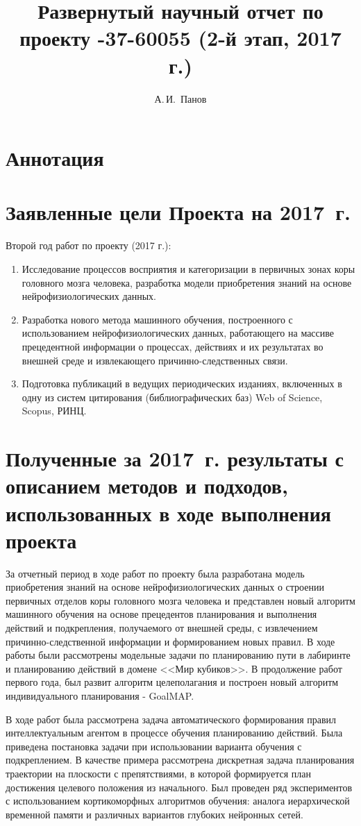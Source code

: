 \documentclass[12pt]{report}
\title{Развернутый научный отчет по проекту \textnumero 16-37-60055 (2-й этап, 2017 г.)}
\author{А.\,И.~Панов}
\begin{document}
	\maketitle
	
	\section*{Аннотация}
	

	\section*{Заявленные цели Проекта на 2017~г.}
	Второй год работ по проекту (2017 г.): 
	\begin{enumerate}
		\item Исследование процессов восприятия и категоризации в первичных зонах коры головного мозга человека, разработка модели приобретения знаний на основе нейрофизиологических данных.
		\item Разработка нового метода машинного обучения, построенного с использованием нейрофизиологических данных, работающего на массиве прецедентной информации о процессах, действиях и их результатах во внешней среде и извлекающего причинно-следственных связи.
		\item Подготовка публикаций в ведущих периодических изданиях, включенных в одну из систем цитирования (библиографических баз) Web of Science, Scopus, РИНЦ.
	\end{enumerate}
	
	\section*{Полученные за 2017~г. результаты с описанием методов и подходов, использованных в ходе выполнения проекта}
	За отчетный период в ходе работ по проекту была разработана модель приобретения знаний на основе нейрофизиологических данных о строении первичных отделов коры головного мозга человека и представлен новый алгоритм машинного обучения на основе прецедентов планирования и выполнения действий и подкрепления, получаемого от внешней среды, с извлечением причинно-следственной информации и формированием новых правил. В ходе работы были рассмотрены модельные задачи по планированию пути в лабиринте и планированию действий в домене <<Мир кубиков>>. В продолжение работ первого года, был развит алгоритм целеполагания и построен новый алгоритм индивидуального планирования - GoalMAP.
	
	В ходе работ была рассмотрена задача автоматического формирования правил интеллектуальным агентом в процессе обучения планированию действий. Была приведена постановка задачи при использовании варианта обучения с подкреплением. В качестве примера рассмотрена дискретная задача планирования траектории на плоскости с препятствиями, в которой формируется план достижения целевого положения из начального. Был проведен ряд экспериментов с использованием кортикоморфных алгоритмов обучения: аналога иерархической временной памяти и различных вариантов глубоких нейронных сетей.
	
\end{document}
